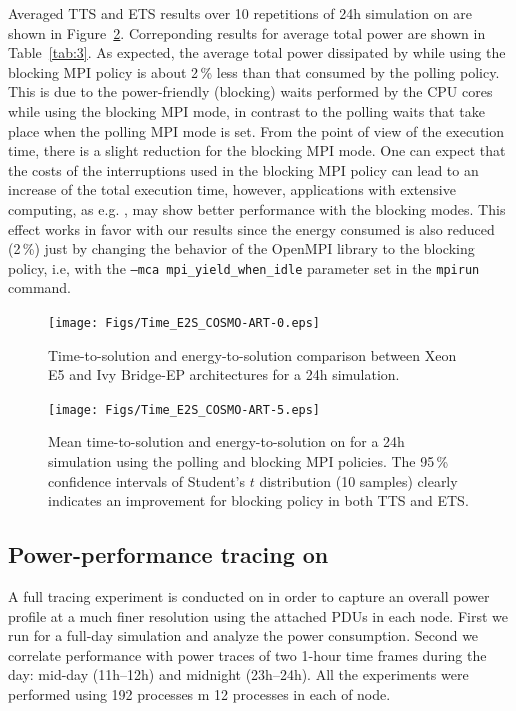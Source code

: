 Averaged TTS and ETS results over 10 repetitions of 24h simulation on \tinto are shown in Figure~\ref{fig:4}. Correponding results for average total power are shown in Table~\ref{tab:3}.  
As expected, the average total power dissipated by \cosmoart while using the blocking MPI policy is about 2\,\% less than that consumed by the polling policy. This is due to the power-friendly (blocking) waits performed by the CPU cores while using the blocking MPI mode, in contrast to the polling waits that take place when the polling MPI mode is set. From the point of view of the execution time, there is a slight reduction for the blocking MPI mode. One can expect that the costs of the interruptions used in the blocking MPI policy can lead to an increase of the total execution time, however, applications with extensive computing, as e.g. \cosmoart, may show better performance with the blocking modes. This effect works in favor with our results since the energy consumed is also reduced (2\,\%) just by changing the behavior of the OpenMPI library to the blocking policy, i.e, with the \texttt{--mca mpi\_yield\_when\_idle} parameter set in the \texttt{mpirun} command.

\begin{figure}[htbf]
  \texttt{[image: Figs/Time\_E2S\_COSMO-ART-0.eps]}
  \caption{Time-to-solution and energy-to-solution comparison between
    Xeon E5 and Ivy Bridge-EP architectures for a 24h simulation.}
  \label{fig:3}
\end{figure}

\begin{figure}[htbf]
  \texttt{[image: Figs/Time\_E2S\_COSMO-ART-5.eps]}
  \caption{Mean time-to-solution and energy-to-solution on
    \tinto for a 24h simulation using the polling and blocking MPI policies. The 95\,\% confidence intervals of Student's $t$ distribution (10 samples) clearly indicates 
    an improvement for blocking policy in both TTS and ETS.}
  \label{fig:4}
\end{figure}

\subsection{Power-performance tracing on \tinto}
\label{subsec:4.3}

A full tracing experiment is conducted on \tinto in order to capture an overall power
profile at a much finer resolution using the attached PDUs in each node. First we run \cosmoart 
for a full-day simulation and analyze the power consumption. Second we correlate performance 
with power traces of two 1-hour time frames during the day: mid-day (11h--12h) and
midnight (23h--24h). All the experiments were performed using 192 \cosmoart processes
m 12 processes in each of node.

